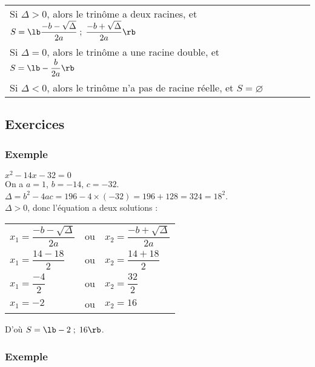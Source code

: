 \begin{tabular}{lll}
Si $\Delta > 0$, alors le trinôme a deux racines, et $S = \lb \dfrac{-b - \sqrt{\Delta}}{2a} \; ; \; \dfrac{-b + \sqrt{\Delta}}{2a} \rb $ \\
Si $\Delta = 0$, alors le trinôme a une racine double, et $S = \lb -\dfrac{b}{2a} \rb $ \\
Si $\Delta < 0$, alors le trinôme n'a pas de racine réelle, et $ S = \varnothing$ \\
\end{tabular}

\newpage

\subsection{Exercices}

\subsubsection{Exemple }

$x^2 - 14x - 32 = 0$ \\

On a $a = 1$, $b = -14$, $c = -32$. \\

$ \Delta = b^2 - 4ac = 196 - 4 \times \left(-32\right) = 196 + 128 = 324 = 18^2$. \\

$\Delta > 0$, donc l'équation a deux solutions : \\

\begin{tabular}{lll}
$x_1 = \dfrac{-b - \sqrt{\Delta}}{2a}$ & ou & $x_2 = \dfrac{-b + \sqrt{\Delta}}{2a}$ \vspace*{.3cm} \\
$ x_1 = \dfrac{14 - 18}{2}$ & ou &$x_2 = \dfrac{14 + 18}{2}$ \vspace*{.3cm} \\
$x_1 = \dfrac{-4}{2}$ & ou & $x_2 = \dfrac{32}{2}$ \vspace*{.3cm} \\
$x_1 = -2$ & ou &$x_2 = 16$ \\
\end{tabular}

\vspace*{.3cm}

D'où $S = \lb -2 \; ; \; 16 \rb$. 

\subsubsection{Exemple }

